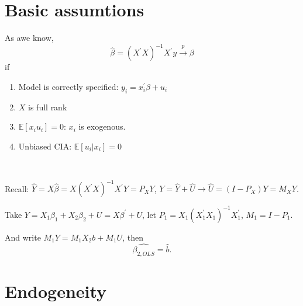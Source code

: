 \section{Basic assumtions}
\label{sec:basic-assumtions}

As awe know, \[
    \hat{\beta} = (X^{\prime} X)^{-1}X^{\prime} y \overset{p}{\to} \beta
\]
if
\begin{enumerate}
    \item Model is correctly specified: $y_i = x_i^{\prime} \beta + u_i$
    \item $X$ is full rank
    \item $\mathbb{E}[x_i u_i] = 0$: $x_i$ is exogenous.
    \item Unbiased CIA: $\mathbb{E}[u_i|x_i] = 0$
\end{enumerate}

\begin{theorem}
    \label{thm:FWL}
    \ 

    Recall: $\hat{Y} = X \hat{\beta} = X(X^{\prime} X)^{-1}X^{\prime} Y = P_X Y$, $Y = \hat{Y} + \hat{U} \rightarrow \hat{U} = (I - P_X)Y = M_X Y$.

    Take $Y = X_1 \beta_1 + X_2 \beta_2 + U = X \beta ^{\prime} +U$,
    let $P_1 = X_1 (X_1^{\prime} X_1)^{-1}X_1^{\prime} $, $M_1 = I - P_1$.

    And write $M_1 Y = M_1 X_2 b + M_1 U$, then
    \[\hat{\beta_{2, OLS}} = \hat{b}.\]
\end{theorem}

\section{Endogeneity}
\label{sec:endogeneity}

